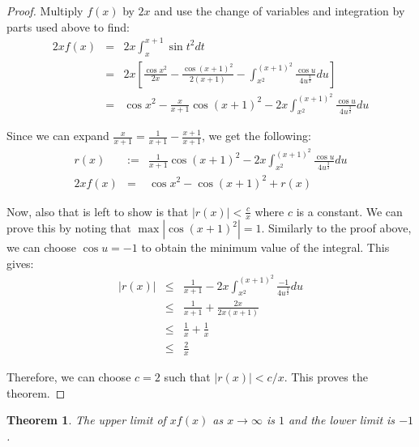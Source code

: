 \documentclass[psamsfonts]{amsart}
\newtheorem{thm}{Theorem}[section]
\theoremstyle{definition}
\theoremstyle{remark}
\numberwithin{equation}{section}
\begin{document}
\begin{proof}
Multiply $f(x)$ by $2x$ and use the change of variables and integration by parts used above to find:
\begin{eqnarray}
2x f(x) &=& 2x \int_{x}^{x+1} \sin t^2 dt \\
&=& 2x \left[ \frac{\cos x^2}{2x} - \frac{\cos(x+1)^2}{2(x+1)} - \int_{x^2}^{(x+1)^2} \frac{\cos u}{4 u^{\frac{3}{2}}} du \right] \\
&=& \cos x^2 - \frac{x}{x+1} \cos (x+1)^2 - 2x \int_{x^2}^{(x+1)^2} \frac{\cos u}{4 u^{\frac{3}{2}}} du 
\end{eqnarray}

Since we can expand $\frac{x}{x+1} = \frac{1}{x+1} - \frac{x+1}{x+1}$, we get the following:
\begin{eqnarray}
r(x) &:=& \frac{1}{x+1} \cos(x+1)^2 - 2x \int_{x^2}^{(x+1)^2} \frac{\cos u}{4 u^{\frac{3}{2}}} du \\
2xf(x) &=& \cos x^2 - \cos(x+1)^2 + r(x)
\end{eqnarray}

Now, also that is left to show is that $|r(x)| < \frac{c}{x}$ where $c$ is a constant. We can prove this by noting that $\max |\cos(x+1)^2| = 1$. Similarly to the proof above, we can choose $\cos u = -1$ to obtain the minimum value of the integral. This gives:
\begin{eqnarray}
|r(x)| &\leq& \frac{1}{x+1} - 2x \int_{x^2}^{(x+1)^2} \frac{-1}{4 u^\frac{3}{2}} du \\
&\leq& \frac{1}{x+1} + \frac{2x}{2x(x+1)} \\
&\leq& \frac{1}{x} + \frac{1}{x} \\
&\leq& \frac{2}{x}
\end{eqnarray}

Therefore, we can choose $c =2$ such that $|r(x)| < c/x$. This proves the theorem.
\end{proof}

\begin{thm}
The upper limit of $x f(x)$ as $x \to \infty$ is $1$ and the lower limit is $-1$. 
\end{thm}
\end{document}
